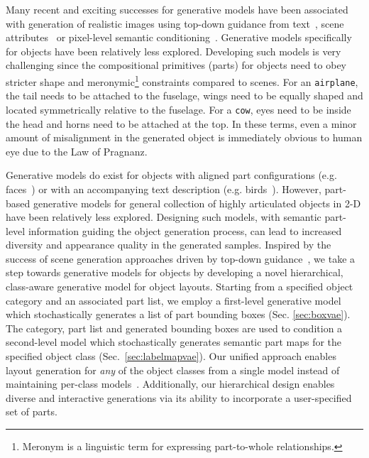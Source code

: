 \documentclass[runningheads]{llncs}
\begin{document}
Many recent and exciting successes for generative models have been associated with generation of realistic images using top-down guidance from text~\cite{hong2018inferring}, scene attributes~\cite{ritchie2019fast} or pixel-level semantic conditioning~\cite{park2019SPADE}. Generative models specifically for objects have been relatively less explored. Developing such models is very challenging since the compositional primitives (parts) for objects need to obey stricter shape and meronymic\footnote{Meronym is a linguistic term for expressing part-to-whole relationships.} constraints compared to scenes. For an \texttt{airplane}, the tail needs to be attached to the fuselage, wings need to be equally shaped and located symmetrically relative to the fuselage. For a \texttt{cow}, eyes need to be inside the head and horns need to be attached at the top. In these terms, even a minor amount of misalignment in the generated object is immediately obvious to human eye due to the Law of Pragnanz.

Generative models do exist for objects with aligned part configurations (e.g. faces~\cite{bessinger2019generative,he2019attgan}) or with an accompanying text description (e.g. birds~\cite{yin2019semantics,zhang2018stackgan++}). However, part-based generative models for general collection of highly articulated objects in 2-D have been relatively less explored. Designing such models, with semantic part-level information guiding the object generation process, can lead to increased diversity and appearance quality in the generated samples. Inspired by the success of scene generation approaches driven by top-down guidance~\cite{hong2018inferring,park2019SPADE}, we take a step towards generative models for objects by developing a novel hierarchical, class-aware generative model for object layouts. Starting from a specified object category and an associated part list, we employ a first-level generative model which stochastically generates a list of part bounding boxes (Sec. \ref{sec:boxvae}). The category, part list and generated bounding boxes are used to condition a second-level model which stochastically generates semantic part maps for the specified object class (Sec.~\ref{sec:labelmapvae}). Our unified approach enables layout generation for \textit{any} of the object classes from a single model instead of maintaining per-class models~\cite{zhang2018stackgan++,li2019layoutgan}. Additionally, our hierarchical design enables diverse and interactive generations via its ability to incorporate a user-specified set of parts.
\end{document}

